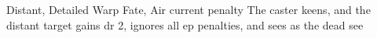   {Distant, Detailed}%
  {Warp}%
  {Fate, Air}%
  {current  penalty}%
  {The caster keens, and the distant target gains \gls{dr} 2, ignores all \gls{ep} penalties, and sees as the dead see}%
  {}

